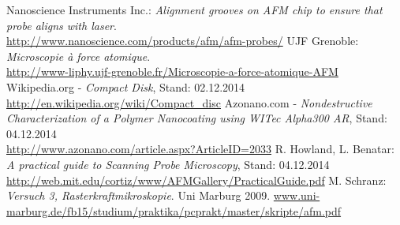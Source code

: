 \documentclass[a4paper, parskip=half, 12pt, bibliography=totocnumbered]{scrartcl}
\begin{document}





\begin{thebibliography}{10}
 Nanoscience Instruments Inc.: \emph{Alignment grooves on AFM chip to ensure that probe aligns with laser}.\\
\url{http://www.nanoscience.com/products/afm/afm-probes/}
 UJF Grenoble: \emph{Microscopie à force atomique}.\\
\url{http://www-liphy.ujf-grenoble.fr/Microscopie-a-force-atomique-AFM}
 Wikipedia.org - \emph{Compact Disk}, Stand: 02.12.2014\\
\url{http://en.wikipedia.org/wiki/Compact_disc}
 Azonano.com - \emph{Nondestructive Characterization of a Polymer Nanocoating using WITec Alpha300 AR}, Stand: 04.12.2014\\
\url{http://www.azonano.com/article.aspx?ArticleID=2033}
 R. Howland, L. Benatar: \emph{A practical guide to Scanning Probe Microscopy}, Stand: 04.12.2014\\
\url{http://web.mit.edu/cortiz/www/AFMGallery/PracticalGuide.pdf}
 M. Schranz: \emph{Versuch 3, Rasterkraftmikroskopie}. Uni Marburg 2009.
\url{www.uni-marburg.de/fb15/studium/praktika/pcprakt/master/skripte/afm.pdf}
\end{thebibliography}
\end{document}
